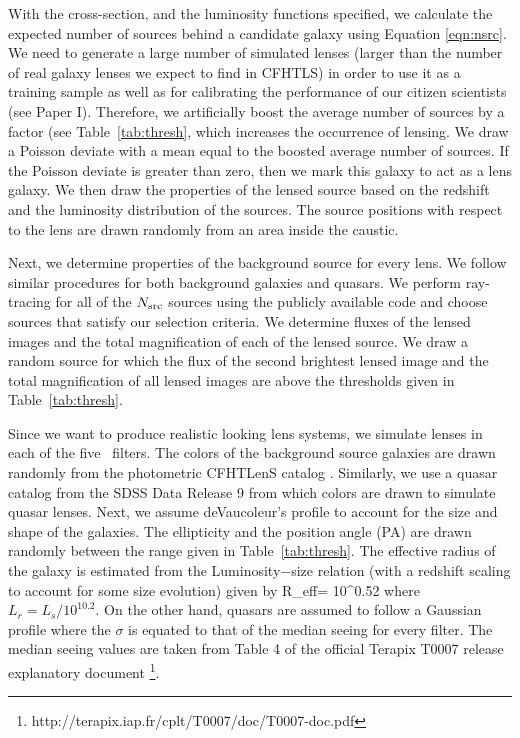 \documentclass[useAMS,usenatbib,a4paper]{mn2e}
\begin{document}
With the cross-section, and the luminosity functions specified, we calculate the
expected number of sources behind a candidate galaxy using Equation
\ref{eqn:nsrc}. We need to generate a large number of simulated lenses (larger
than the number of real galaxy lenses we expect to find in CFHTLS) in order to
use it as a training sample as well as for calibrating the performance of our
citizen scientists (see Paper I). Therefore, we artificially boost the average
number of sources by a factor (see Table~\ref{tab:thresh}, which increases the
occurrence of lensing. We draw a Poisson deviate with a mean equal to the
boosted average number of sources. If the Poisson deviate is greater than zero,
then we mark this galaxy to act as a lens galaxy. We then draw the properties of
the lensed source based on the redshift and the luminosity distribution of the
sources. The source positions with respect to the lens are drawn randomly from
an area inside the caustic.

Next, we determine properties of the background source for every lens. We follow
similar procedures for both background galaxies and quasars. We perform
ray-tracing for all of the $N_{\rm src}$ sources using the publicly available
code \gravlens \citep{Keeton2000} and choose sources that satisfy our
selection criteria. We determine fluxes of the lensed images and the total
magnification of each of the lensed source. We draw a random source for which
the flux of the second brightest lensed image and the total magnification of all
lensed images are above the thresholds given in Table~\ref{tab:thresh}.

Since we want to produce realistic looking lens systems, we simulate lenses in
each of the five \cfhtls~filters. The colors of the background source galaxies are drawn
randomly from the photometric CFHTLenS catalog
\citep{Hildebrandt2012,Erben2013}.  Similarly, we use a quasar catalog from the
SDSS Data Release 9 \citep{Paris2012} from which colors are drawn to simulate
quasar lenses. Next, we assume deVaucoleur's profile to account for the size
and shape of the galaxies. The ellipticity and the position angle (PA) are drawn
randomly between the range given in Table~\ref{tab:thresh}. The effective
radius of the galaxy is estimated from the Luminosity$-$size relation
\citep{Bernardi2003} (with a redshift scaling to account for some size
evolution) given by
\be
R_{\rm eff}= 10^{0.52} 
\ee
where $L_r=L_s/10^{10.2}$. On the other hand, quasars are assumed to follow a
Gaussian profile where the $\sigma$ is equated to that of the median seeing for
every filter. The median seeing values are taken from Table 4 of the official
Terapix T0007 release explanatory document \footnote{
    http://terapix.iap.fr/cplt/T0007/doc/T0007-doc.pdf}.
\end{document}
